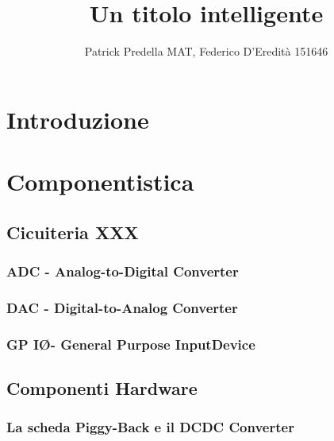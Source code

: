 \documentclass[10pt]{article}
\title{Un titolo intelligente}
\author{Patrick Predella MAT, Federico D'Eredità 151646 }
\date{}
\begin{document}
\maketitle

\section{Introduzione}

\section{Componentistica}
	\subsection{Cicuiteria XXX} %

		\subsubsection{ADC - Analog-to-Digital Converter}
	
		\subsubsection{DAC - Digital-to-Analog Converter}
	
		\subsubsection{GP I\O - General Purpose Input\Output Device}
	
	\subsection{Componenti Hardware}
		\subsubsection{La scheda Piggy-Back e il DCDC Converter}
		
\end{document}
